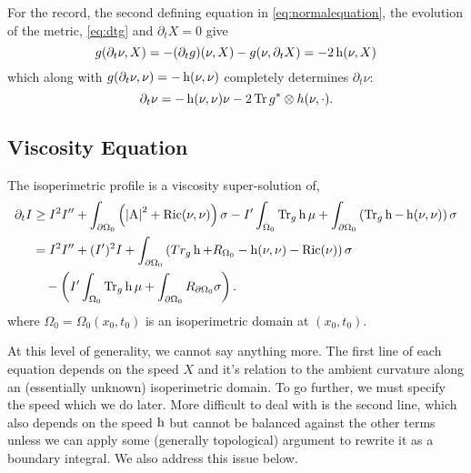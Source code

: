 \documentclass{amsart}
\begin{document}
\begin{rem}
For the record, the second defining equation in \eqref{eq:normalequation}, the evolution of the metric, \eqref{eq:dtg} and \(\partial_t X = 0\) give
\[
g(\partial_t \nu, X) = -(\partial_t g) (\nu, X) - g(\nu, \partial_t X) = -2 \operatorname{h}(\nu, X)
\]
which along with \(g(\partial_t \nu, \nu) = - \operatorname{h}(\nu, \nu)\) completely determines \(\partial_t \nu\):
\[
\partial_t \nu = -\operatorname{h}(\nu, \nu) \nu -2 \operatorname{Tr} g^{\ast} \otimes h(\nu, \cdot).
\]
\end{rem}

\subsection{Viscosity Equation}
\label{subsec:iso_diff_ineq_viscosity}

\begin{thm}
\label{thm:general_viscosity}
The isoperimetric profile is a viscosity super-solution of,
\[
\begin{split}
\partial_t I &\geq I^2 I'' +  \int_{\partial {\Omega_0}} \left(\left|{\operatorname{A}}\right|^2 + \operatorname{Ric}(\nu, \nu)\right) \sigma  - I'\int_{\Omega_0} \operatorname{Tr}_g \operatorname{h} \mu + \int_{\partial {\Omega_0}} \left(\operatorname{Tr}_g \operatorname{h} - \operatorname{h}(\nu, \nu)\right) \sigma \\
&= I^2 I'' +  (I')^2 I + \int_{\partial {\Omega_0}} \left(Tr_g \operatorname{h} + R_{\Omega_0} - \operatorname{h}(\nu, \nu) - \operatorname{Ric}(\nu)\right) \sigma \\
&\quad - \left(I'\int_{\Omega_0} \operatorname{Tr}_g \operatorname{h} \mu + \int_{\partial {\Omega_0}} R_{\partial {\Omega_0}}\sigma \right) .
\end{split}
\]
where \(\Omega_0 = \Omega_0(x_0, t_0)\) is an isoperimetric domain at \((x_0, t_0)\).
\end{thm}

\begin{rem}
At this level of generality, we cannot say anything more. The first line of each equation depends on the speed \(X\) and it's relation to the ambient curvature along an (essentially unknown) isoperimetric domain. To go further, we must specify the speed which we do later. More difficult to deal with is the second line, which also depends on the speed \(\operatorname{h}\) but cannot be balanced against the other terms unless we can apply some (generally topological) argument to rewrite it as a boundary integral. We also address this issue below.
\end{rem}
\end{document}
